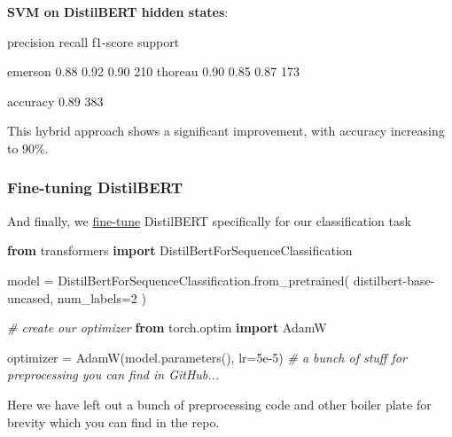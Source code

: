 \documentclass[
]{article}
\newenvironment{Shaded}{}{}
\newcommand{\CommentTok}[1]{\textcolor[rgb]{0.38,0.63,0.69}{\textit{#1}}}
\newcommand{\DecValTok}[1]{\textcolor[rgb]{0.25,0.63,0.44}{#1}}
\newcommand{\FloatTok}[1]{\textcolor[rgb]{0.25,0.63,0.44}{#1}}
\newcommand{\ImportTok}[1]{\textcolor[rgb]{0.00,0.50,0.00}{\textbf{#1}}}
\newcommand{\NormalTok}[1]{#1}
\newcommand{\OperatorTok}[1]{\textcolor[rgb]{0.40,0.40,0.40}{#1}}
\newcommand{\StringTok}[1]{\textcolor[rgb]{0.25,0.44,0.63}{#1}}
\begin{document}
\textbf{SVM on DistilBERT hidden states}:

\begin{Shaded}
\begin{Highlighting}[]
\NormalTok{precision    recall  f1{-}score   support}

\NormalTok{emerson       0.88      0.92      0.90       210}
\NormalTok{thoreau       0.90      0.85      0.87       173}

\NormalTok{accuracy                          0.89       383}
\end{Highlighting}
\end{Shaded}

This hybrid approach shows a significant improvement, with accuracy
increasing to 90\%.

\subsubsection{Fine-tuning DistilBERT}\label{fine-tuning-distilbert}

And finally, we
\href{https://huggingface.co/docs/transformers/en/training}{fine-tune}
DistilBERT specifically for our classification task

\begin{Shaded}
\begin{Highlighting}[]
\ImportTok{from}\NormalTok{ transformers }\ImportTok{import}\NormalTok{ DistilBertForSequenceClassification}

\NormalTok{model }\OperatorTok{=}\NormalTok{ DistilBertForSequenceClassification.from\_pretrained(}
    \StringTok{\textquotesingle{}distilbert{-}base{-}uncased\textquotesingle{}}\NormalTok{, num\_labels}\OperatorTok{=}\DecValTok{2}
\NormalTok{)}

\CommentTok{\# create our optimizer}
\ImportTok{from}\NormalTok{ torch.optim }\ImportTok{import}\NormalTok{ AdamW}

\NormalTok{optimizer }\OperatorTok{=}\NormalTok{ AdamW(model.parameters(), lr}\OperatorTok{=}\FloatTok{5e{-}5}\NormalTok{)}
\CommentTok{\# a bunch of stuff for preprocessing you can find in GitHub...}
\end{Highlighting}
\end{Shaded}

Here we have left out a bunch of preprocessing code and other boiler
plate for brevity which you can find in the repo.
\end{document}

